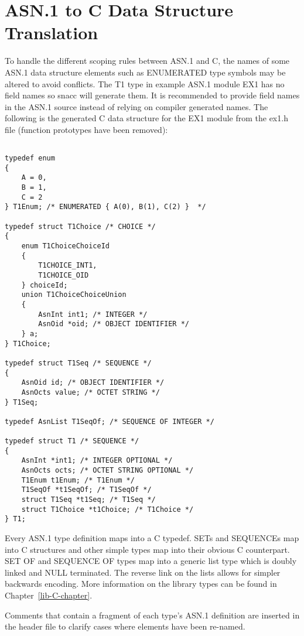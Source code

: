\section{\label{type-gen-C-section}ASN.1 to C Data Structure Translation}

To handle the different scoping rules between ASN.1 and C, the names
of some ASN.1 data structure elements such as ENUMERATED type symbols
may be altered to avoid conflicts.  The T1 type in example ASN.1
module EX1 has no field names so snacc will generate them.  It is
recommended to provide field names in the ASN.1 source instead of
relying on compiler generated names.  The following is the generated C
data structure for the EX1 module from the {\ufn ex1.h} file (function
prototypes have been removed):

\begin{small}
\begin{verbatim}

typedef enum
{
    A = 0,
    B = 1,
    C = 2
} T1Enum; /* ENUMERATED { A(0), B(1), C(2) }  */

typedef struct T1Choice /* CHOICE */
{
    enum T1ChoiceChoiceId
    {
        T1CHOICE_INT1,
        T1CHOICE_OID
    } choiceId;
    union T1ChoiceChoiceUnion
    {
        AsnInt int1; /* INTEGER */
        AsnOid *oid; /* OBJECT IDENTIFIER */
    } a;
} T1Choice;

typedef struct T1Seq /* SEQUENCE */
{
    AsnOid id; /* OBJECT IDENTIFIER */
    AsnOcts value; /* OCTET STRING */
} T1Seq;

typedef AsnList T1SeqOf; /* SEQUENCE OF INTEGER */

typedef struct T1 /* SEQUENCE */
{
    AsnInt *int1; /* INTEGER OPTIONAL */
    AsnOcts octs; /* OCTET STRING OPTIONAL */
    T1Enum t1Enum; /* T1Enum */
    T1SeqOf *t1SeqOf; /* T1SeqOf */
    struct T1Seq *t1Seq; /* T1Seq */
    struct T1Choice *t1Choice; /* T1Choice */
} T1;
\end{verbatim}
\end{small}

Every ASN.1 type definition maps into a C {\C typedef}.  SETs and
SEQUENCEs map into C structures and other simple types map into their
obvious C counterpart.  SET OF and SEQUENCE OF types map into a
generic list type which is doubly linked and NULL terminated.  The
reverse link on the lists allows for simpler backwards encoding.  More
information on the library types can be found in Chapter~\ref{lib-C-chapter}.

Comments that contain a fragment of each type's ASN.1 definition are
inserted in the header file to clarify cases where elements have been
re-named.

